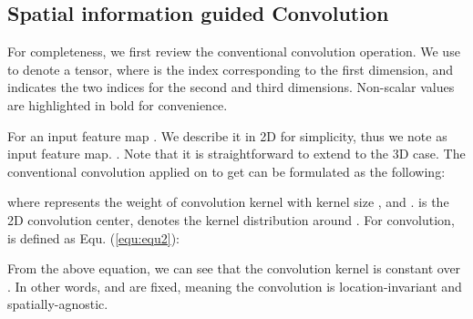 \documentclass[journal]{IEEEtran}
\newcommand{\equref}[1]{Equ. (\ref{#1})}
\begin{document}
\subsection{Spatial information guided Convolution}
For completeness, we first review the conventional convolution operation.
We use  
to denote a tensor, where
 is the index corresponding to the first dimension, and 
indicates the two indices for the second and third dimensions.
Non-scalar values are highlighted in bold for convenience.


For an input feature map .
We describe it in 2D for simplicity, thus 
we note  as input feature map.
.
Note that it is straightforward
to extend to the 3D case.
The conventional convolution applied on  to 
get  can be formulated as the following:

where 
represents the weight of convolution kernel with kernel 
size , and . 
is the 2D convolution center, 
denotes the kernel distribution around . For 
convolution,  is defined as \equref{equ:equ2}:


From the above equation, we can see that the convolution kernel 
is constant over . In other words,
 and  are fixed, meaning the convolution 
is location-invariant and spatially-agnostic.
\end{document}

